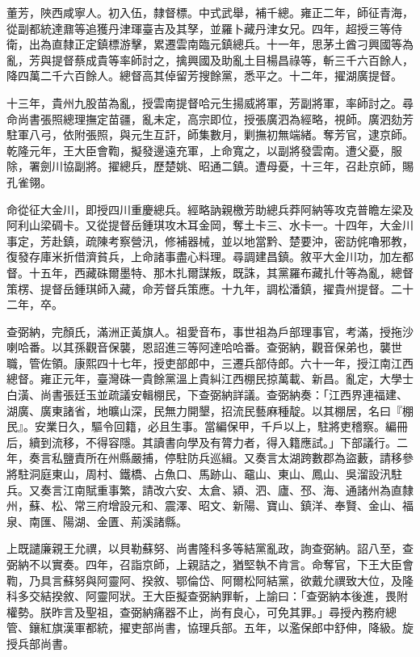 \begin{pinyinscope}
董芳，陜西咸寧人。初入伍，隸督標。中式武舉，補千總。雍正二年，師征青海，從副都統達鼐等追獲丹津琿臺吉及其孥，並羅卜藏丹津女兄。四年，超授三等侍衛，出為直隸正定鎮標游擊，累遷雲南臨元鎮總兵。十一年，思茅土酋刁興國等為亂，芳與提督蔡成貴等率師討之，擒興國及助亂土目楊昌祿等，斬三千六百餘人，降四萬二千六百餘人。總督高其倬留芳搜餘黨，悉平之。十二年，擢湖廣提督。

十三年，貴州九股苗為亂，授雲南提督哈元生揚威將軍，芳副將軍，率師討之。尋命尚書張照總理撫定苗疆，亂未定，高宗即位，授張廣泗為經略，視師。廣泗劾芳駐軍八弓，依附張照，與元生互訐，師集數月，剿撫初無端緒。奪芳官，逮京師。乾隆元年，王大臣會鞫，擬發邊遠充軍，上命寬之，以副將發雲南。遭父憂，服除，署劍川協副將。擢總兵，歷楚姚、昭通二鎮。遭母憂，十三年，召赴京師，賜孔雀翎。

命從征大金川，即授四川重慶總兵。經略訥親檄芳助總兵莽阿納等攻克普瞻左梁及阿利山梁碉卡。又從提督岳鍾琪攻木耳金岡，奪土卡三、水卡一。十四年，大金川事定，芳赴鎮，疏陳考察營汛，修補器械，並以地當黔、楚要沖，密訪侂嚕邪教，復發存庫米折借濟貧兵，上命諸事盡心料理。尋調建昌鎮。敘平大金川功，加左都督。十五年，西藏硃爾墨特、那木扎爾謀叛，既誅，其黨羅布藏扎什等為亂，總督策楞、提督岳鍾琪師入藏，命芳督兵策應。十九年，調松潘鎮，擢貴州提督。二十二年，卒。

查弼納，完顏氏，滿洲正黃旗人。祖愛音布，事世祖為戶部理事官，考滿，授拖沙喇哈番。以其孫觀音保襲，恩詔進三等阿達哈哈番。查弼納，觀音保弟也，襲世職，管佐領。康熙四十七年，授吏部郎中，三遷兵部侍郎。六十一年，授江南江西總督。雍正元年，臺灣硃一貴餘黨溫上貴糾江西棚民掠萬載、新昌。亂定，大學士白潢、尚書張廷玉並疏議安輯棚民，下查弼納詳議。查弼納奏：「江西界連福建、湖廣、廣東諸省，地曠山深，民無力開墾，招流民藝麻種靛。以其棚居，名曰『棚民』。安業日久，驅令回籍，必且生事。當編保甲，千戶以上，駐將吏稽察。編冊后，續到流移，不得容隱。其讀書向學及有膂力者，得入籍應試。」下部議行。二年，奏言私鹽責所在州縣嚴捕，停駐防兵巡緝。又奏言太湖跨數郡為盜藪，請移參將駐洞庭東山，周村、鐵橋、占魚口、馬跡山、黿山、東山、鳳山、吳溜設汛駐兵。又奏言江南賦重事繁，請改六安、太倉、潁、泗、廬、邳、海、通諸州為直隸州，蘇、松、常三府增設元和、震澤、昭文、新陽、寶山、鎮洋、奉賢、金山、福泉、南匯、陽湖、金匱、荊溪諸縣。

上既譴廉親王允禩，以貝勒蘇努、尚書隆科多等結黨亂政，詢查弼納。詔八至，查弼納不以實奏。四年，召詣京師，上親詰之，猶堅執不肯言。命奪官，下王大臣會鞫，乃具言蘇努與阿靈阿、揆敘、鄂倫岱、阿爾松阿結黨，欲戴允禩致大位，及隆科多交結揆敘、阿靈阿狀。王大臣擬查弼納罪斬，上諭曰：「查弼納本後進，畏附權勢。朕昨言及聖祖，查弼納痛器不止，尚有良心，可免其罪。」尋授內務府總管、鑲紅旗漢軍都統，擢吏部尚書，協理兵部。五年，以濫保郎中舒伸，降級。旋授兵部尚書。


\end{pinyinscope}
